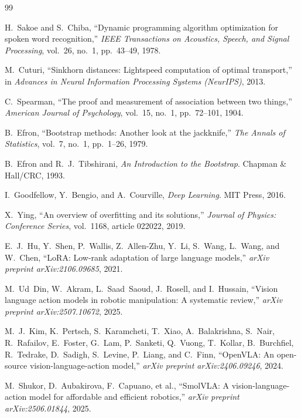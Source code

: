 \documentclass[11pt]{article}
\numberwithin{equation}{section}
\numberwithin{table}{section}
\numberwithin{figure}{section}
\begin{document}
\begin{thebibliography}{99}

H.~Sakoe and S.~Chiba, ``Dynamic programming algorithm optimization for spoken word recognition,''
\emph{IEEE Transactions on Acoustics, Speech, and Signal Processing}, vol.~26, no.~1, pp.~43--49, 1978.

M.~Cuturi, ``Sinkhorn distances: Lightspeed computation of optimal transport,'' in \emph{Advances in
Neural Information Processing Systems (NeurIPS)}, 2013.

C.~Spearman, ``The proof and measurement of association between two things,'' \emph{American Journal of
Psychology}, vol.~15, no.~1, pp.~72--101, 1904.

B.~Efron, ``Bootstrap methods: Another look at the jackknife,'' \emph{The Annals of Statistics}, vol.~7,
no.~1, pp.~1--26, 1979.

B.~Efron and R.~J.~Tibshirani, \emph{An Introduction to the Bootstrap}. Chapman \& Hall/CRC, 1993.

I.~Goodfellow, Y.~Bengio, and A.~Courville, \emph{Deep Learning}. MIT Press, 2016.

X.~Ying, ``An overview of overfitting and its solutions,'' \emph{Journal of Physics: Conference Series},
vol.~1168, article 022022, 2019.

E.~J.~Hu, Y.~Shen, P.~Wallis, Z.~Allen-Zhu, Y.~Li, S.~Wang, L.~Wang, and W.~Chen, ``LoRA: Low-rank
adaptation of large language models,'' \emph{arXiv preprint arXiv:2106.09685}, 2021.

M.~Ud~Din, W.~Akram, L.~Saad~Saoud, J.~Rosell, and I.~Hussain, ``Vision language action models in robotic
manipulation: A systematic review,'' \emph{arXiv preprint arXiv:2507.10672}, 2025.

M.~J.~Kim, K.~Pertsch, S.~Karamcheti, T.~Xiao, A.~Balakrishna, S.~Nair, R.~Rafailov, E.~Foster, G.~Lam,
P.~Sanketi, Q.~Vuong, T.~Kollar, B.~Burchfiel, R.~Tedrake, D.~Sadigh, S.~Levine, P.~Liang, and C.~Finn,
``OpenVLA: An open-source vision-language-action model,'' \emph{arXiv preprint arXiv:2406.09246}, 2024.

M.~Shukor, D.~Aubakirova, F.~Capuano, et al., ``SmolVLA: A vision-language-action model for affordable
and efficient robotics,'' \emph{arXiv preprint arXiv:2506.01844}, 2025.


\end{thebibliography}
\end{document}
